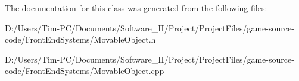 The documentation for this class was generated from the following files\+:\begin{DoxyCompactItemize}
\item 
D\+:/\+Users/\+Tim-\/\+P\+C/\+Documents/\+Software\+\_\+\+I\+I/\+Project/\+Project\+Files/game-\/source-\/code/\+Front\+End\+Systems/Movable\+Object.\+h\item 
D\+:/\+Users/\+Tim-\/\+P\+C/\+Documents/\+Software\+\_\+\+I\+I/\+Project/\+Project\+Files/game-\/source-\/code/\+Front\+End\+Systems/Movable\+Object.\+cpp\end{DoxyCompactItemize}
